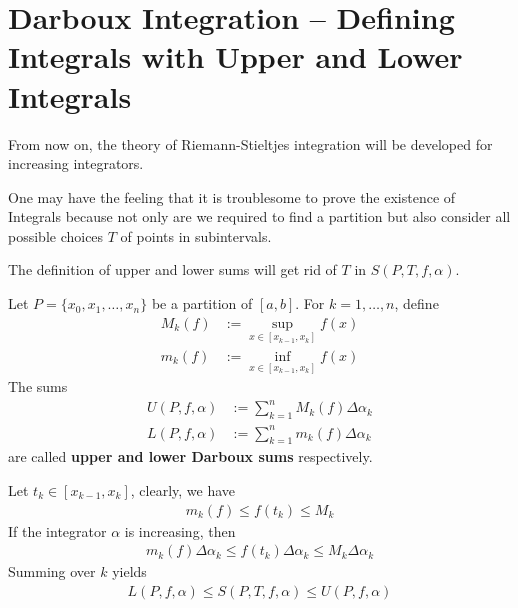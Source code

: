 \documentclass[thmcnt=section, color=blue, 12pt]{my-elegantbook}
\begin{document}


\section{Darboux Integration -- Defining Integrals with Upper and Lower Integrals}

From now on, the theory of Riemann-Stieltjes integration
will be developed for increasing integrators.

One may have the feeling that
it is troublesome to prove the existence of Integrals
because not only are we required to find a partition
but also consider all possible choices $T$ of points in subintervals.

The definition of upper and lower sums
will get rid of $T$ in $S(P,T,f,\alpha)$.


\begin{definition}
	Let $P=\{x_0, x_1, \ldots, x_n\}$ be a partition of $[a, b]$.
	For $k=1, \ldots, n$, define
	\begin{align*}
		M_k(f) & := \sup_{x \in [x_{k-1}, x_{k}]} f(x) \\
		m_k(f) & := \inf_{x \in [x_{k-1}, x_k]} f(x)
	\end{align*}
	The sums
	\begin{align*}
		U(P, f, \alpha) & := \sum_{k=1}^n M_k(f) \Delta\alpha_k \\
		L(P, f, \alpha) & := \sum_{k=1}^n m_k(f) \Delta\alpha_k
	\end{align*}
	are called \textbf{upper and lower Darboux sums} respectively.
\end{definition}

Let $t_k \in [x_{k-1}, x_k]$, clearly, we have
\begin{align*}
	m_k(f) \leq f(t_k) \leq M_k
\end{align*}
If the integrator $\alpha$ is increasing, then
\begin{align*}
	m_k(f) \Delta \alpha_k \leq f(t_k) \Delta \alpha_k \leq M_k \Delta \alpha_k
\end{align*}
Summing over $k$ yields
\begin{align*}
	L(P, f, \alpha) \leq S(P, T, f, \alpha) \leq U(P, f, \alpha)
\end{align*}
\end{document}

